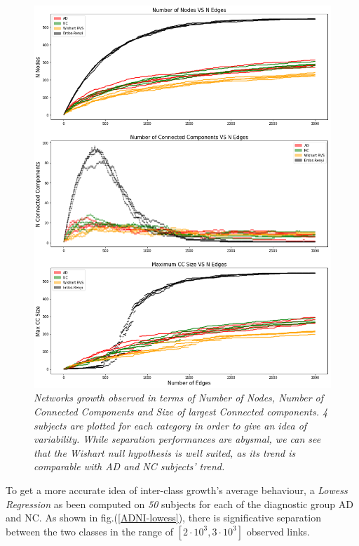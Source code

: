 \documentclass[12pt,openright,twoside,a4paper]{book}
\begin{document}
\begin{figure}[!h]
\centering
\includegraphics[scale=0.5]{ADNI-Ngrowth}
\caption{\textit{Networks growth observed in terms of Number of Nodes, Number of Connected Components and Size of largest Connected components. 4 subjects are plotted for each category in order to give an idea of variability. While separation performances are abysmal, we can see that the Wishart null hypothesis is well suited, as its trend is comparable with AD and NC subjects' trend. }}
\label{ADNI-Ngrowth}
\end{figure}

\clearpage

To get a more accurate idea of inter-class growth's average behaviour, a \textit{Lowess Regression} \cite{Lowess} as been computed on \textit{50} subjects for each of the diagnostic group AD and NC.
As shown in fig.(\ref{ADNI-lowess}), there is significative separation between the two classes in the range of $[2\cdot 10^3,3\cdot 10^3]$ observed links.
\end{document}
